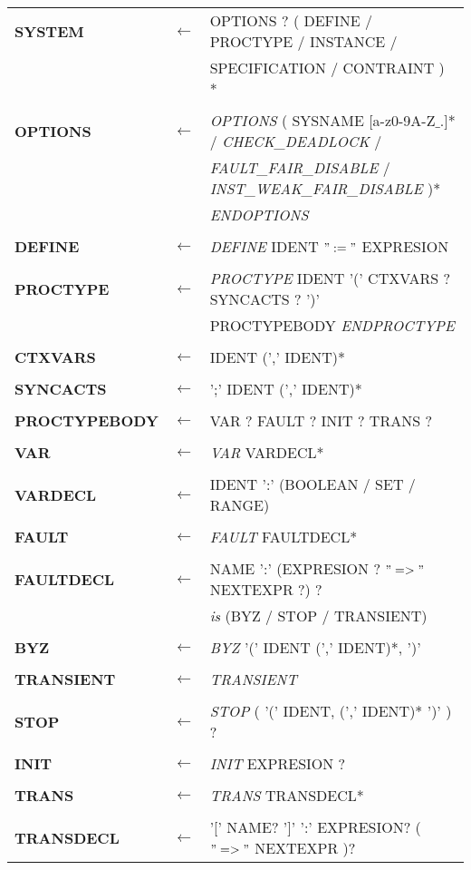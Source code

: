 \documentclass[titlepage, 12pt]{book}
\begin{document}
\noindent \begin{longtable}{>{\bfseries}lll}
SYSTEM & $\longleftarrow$ & OPTIONS ? ( DEFINE / PROCTYPE / INSTANCE /\\
		&				&  SPECIFICATION / CONTRAINT ) *\\\\
OPTIONS & $\longleftarrow$ & \textit{OPTIONS} ( SYSNAME [a-z0-9A-Z$\_$.]* / \textit{CHECK\_DEADLOCK} /\\ 
        &                 & \textit{FAULT\_FAIR\_DISABLE} / \textit{INST\_WEAK\_FAIR\_DISABLE} )* \\
        &                 & \textit{ENDOPTIONS}\\\\
DEFINE & $\longleftarrow$ & \textit{DEFINE} IDENT $":="$  EXPRESION \\\\
PROCTYPE & $\longleftarrow$ & \textit{PROCTYPE} IDENT '(' CTXVARS ? SYNCACTS ? ')' \\
		 &			  & PROCTYPEBODY \textit{ENDPROCTYPE}\\\\
CTXVARS & $\longleftarrow$ & IDENT (',' IDENT)*\\\\
SYNCACTS & $\longleftarrow$ & ';' IDENT (',' IDENT)*\\\\
PROCTYPEBODY & $\longleftarrow$ & VAR ? FAULT ? INIT ? TRANS ?\\\\
VAR & $\longleftarrow$ & \textit{VAR} VARDECL*\\\\
VARDECL & $\longleftarrow$ & IDENT ':' (BOOLEAN / SET / RANGE)\\\\
FAULT & $\longleftarrow$ & \textit{FAULT} FAULTDECL*\\\\
FAULTDECL & $\longleftarrow$ & NAME ':' (EXPRESION ? $"=>"$ NEXTEXPR ?) ? \\
		  &				   & \textit{is} (BYZ / STOP / TRANSIENT)\\\\
BYZ & $\longleftarrow$ & \textit{BYZ} '(' IDENT (',' IDENT)*, ')'\\\\
TRANSIENT & $\longleftarrow$ & \textit{TRANSIENT}\\\\
STOP & $\longleftarrow$ & \textit{STOP} ( '(' IDENT, (',' IDENT)* ')' ) ?\\\\
INIT & $\longleftarrow$ & \textit{INIT} EXPRESION ?\\\\
TRANS & $\longleftarrow$ & \textit{TRANS} TRANSDECL*\\\\
TRANSDECL & $\longleftarrow$ & '[' NAME? ']' ':' EXPRESION? ( $"=>"$ NEXTEXPR )?\\
\end{longtable}
~\\\\
\end{document}
